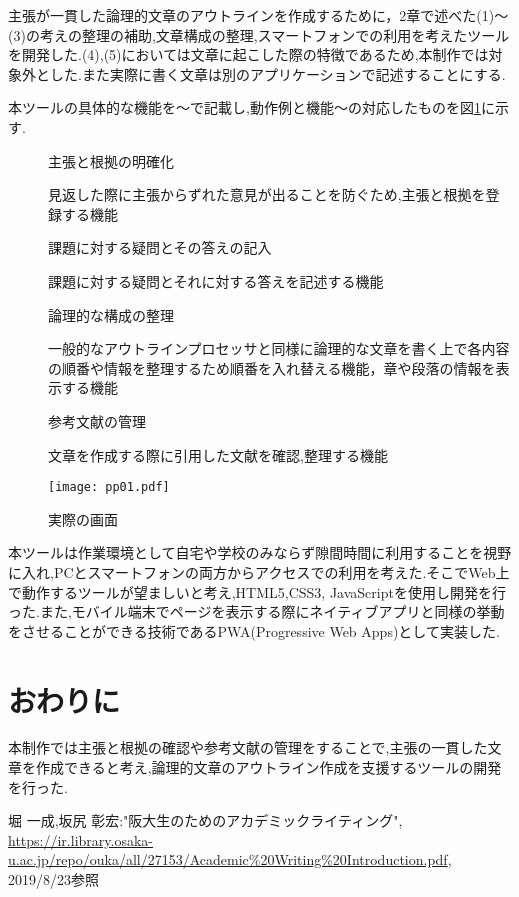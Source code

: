 \documentclass[twocolumn,10pt,a4j]{jsarticle}
\begin{document}
主張が一貫した論理的文章のアウトラインを作成するために，2章で述べた(1)〜(3)の考えの整理の補助,文章構成の整理,スマートフォンでの利用を考えたツールを開発した.(4),(5)においては文章に起こした際の特徴であるため,本制作では対象外とした.また実際に書く文章は別のアプリケーションで記述することにする.

本ツールの具体的な機能を〜で記載し,動作例と機能〜の対応したものを図\ref{fig:g}に示す.
\begin{description}
  \item[]主張と根拠の明確化
  
 見返した際に主張からずれた意見が出ることを防ぐため,主張と根拠を登録する機能
  
  \item[]課題に対する疑問とその答えの記入
  
課題に対する疑問とそれに対する答えを記述する機能
  
  \item[]論理的な構成の整理
  
  一般的なアウトラインプロセッサと同様に論理的な文章を書く上で各内容の順番や情報を整理するため順番を入れ替える機能，章や段落の情報を表示する機能
  
  \item[]参考文献の管理
  
  文章を作成する際に引用した文献を確認,整理する機能 
  
  
\end{description}

\begin{figure}[h]
\begin{center}
 \texttt{[image: pp01.pdf]}
\end{center}
 \caption{実際の画面}
 \label{fig:g}
\end{figure}

本ツールは作業環境として自宅や学校のみならず隙間時間に利用することを視野に入れ,PCとスマートフォンの両方からアクセスでの利用を考えた.そこでWeb上で動作するツールが望ましいと考え,HTML5,CSS3, JavaScriptを使用し開発を行った.また,モバイル端末でページを表示する際にネイティブアプリと同様の挙動をさせることができる技術であるPWA(Progressive Web Apps)として実装した.
\section{おわりに}
本制作では主張と根拠の確認や参考文献の管理をすることで,主張の一貫した文章を作成できると考え,論理的文章のアウトライン作成を支援するツールの開発を行った.

\begin{thebibliography}{99}
 堀 一成,坂尻 彰宏:"阪大生のためのアカデミックライティング",
\url{https://ir.library.osaka-u.ac.jp/repo/ouka/all/27153/Academic%20Writing%20Introduction.pdf}, 2019/8/23参照


\end{thebibliography}
\end{document}
